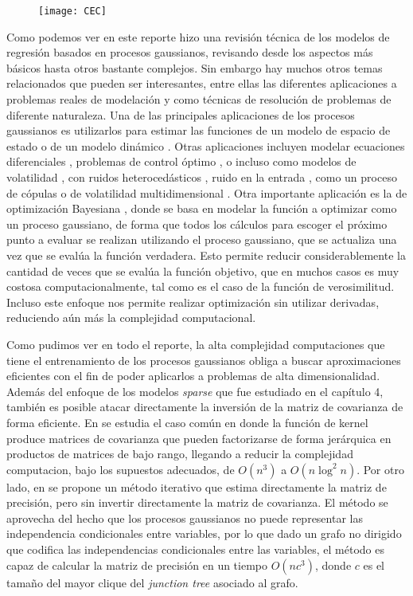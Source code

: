 \begin{figure}
	\centering
	\texttt{[image: CEC]}
\end{figure}



Como podemos ver en este reporte hizo una revisión técnica de los modelos de regresión basados en procesos gaussianos, revisando desde los aspectos más básicos hasta otros bastante complejos. Sin embargo hay muchos otros temas relacionados que pueden ser interesantes, entre ellas las diferentes aplicaciones a problemas reales de modelación y como técnicas de resolución de problemas de diferente naturaleza. Una de las principales aplicaciones de los procesos gaussianos es utilizarlos para estimar las funciones de un modelo de espacio de estado \cite{2}\cite{3}\cite{4}\cite{5} o de un modelo dinámico \cite{58}. Otras aplicaciones incluyen modelar ecuaciones diferenciales \cite{35}, problemas de control óptimo \cite{34}, o incluso como modelos de volatilidad \cite{63}, con ruidos heterocedásticos \cite{59}\cite{61}, ruido en la entrada \cite{57}, como un proceso de cópulas \cite{62} o de volatilidad multidimensional \cite{64}. Otra importante aplicación es la de optimización Bayesiana \cite{67}\cite{68}, donde se basa en modelar la función a optimizar como un proceso gaussiano, de forma que todos los cálculos para escoger el próximo punto a evaluar se realizan utilizando el proceso gaussiano, que se actualiza una vez que se evalúa la función verdadera. Esto permite reducir considerablemente la cantidad de veces que se evalúa la función objetivo, que en muchos casos es muy costosa computacionalmente, tal como es el caso de la función de verosimilitud. Incluso este enfoque nos permite realizar optimización sin utilizar derivadas, reduciendo aún más la complejidad computacional.

Como pudimos ver en todo el reporte, la alta complejidad computaciones que tiene el entrenamiento de los procesos gaussianos obliga a buscar aproximaciones eficientes con el fin de poder aplicarlos a problemas de alta dimensionalidad. Además del enfoque de los modelos \emph{sparse} que fue estudiado en el capítulo 4, también es posible atacar directamente la inversión de la matriz de covarianza de forma eficiente. En \cite{18} se estudia el caso común en donde la función de kernel produce matrices de covarianza que pueden factorizarse de forma jerárquica en productos de matrices de bajo rango, llegando a reducir la complejidad computacion, bajo los supuestos adecuados, de $O\left( n^{3}\right) $ a $O\left( n\log ^{2}n\right) $. Por otro lado, en \cite{19} se propone un método iterativo que estima directamente la matriz de precisión, pero sin invertir directamente la matriz de covarianza. El método se aprovecha del hecho que los procesos gaussianos no puede representar las independencia condicionales entre variables, por lo que dado un grafo no dirigido que codifica las independencias condicionales entre las variables, el método es capaz de calcular la matriz de precisión en un tiempo $O\left( nc^{3}\right) $, donde $c$ es el tama\~{n}o del mayor clique del \emph{junction tree} asociado al grafo.

